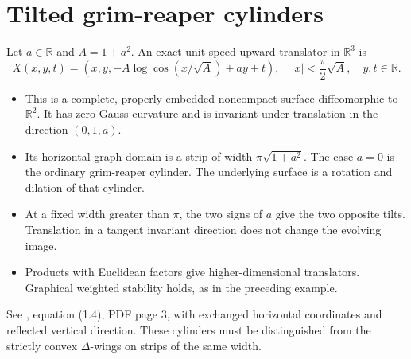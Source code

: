 \chapter{Tilted grim-reaper cylinders}\label{sec:catalogue-tilted-grim-reaper}
\begin{example}\label{ex:catalogue-tilted-grim-reaper}
Let $a\in\mathbb R$ and $A=1+a^2$. An exact unit-speed upward translator in $\mathbb R^3$ is
\[
 X(x,y,t)=\left(x,y,-A\log\cos(x/\sqrt A)+ay+t\right),\quad
 |x|<\frac\pi2\sqrt A,\quad y,t\in\mathbb R.
\]
\begin{itemize}
\item This is a complete, properly embedded noncompact surface diffeomorphic to $\mathbb R^2$. It has zero Gauss curvature and is invariant under translation in the direction $(0,1,a)$.
\item Its horizontal graph domain is a strip of width $\pi\sqrt{1+a^2}$. The case $a=0$ is the ordinary grim-reaper cylinder. The underlying surface is a rotation and dilation of that cylinder.
\item At a fixed width greater than $\pi$, the two signs of $a$ give the two opposite tilts. Translation in a tangent invariant direction does not change the evolving image.
\item Products with Euclidean factors give higher-dimensional translators. Graphical weighted stability holds, as in the preceding example.
\end{itemize}
See \cite{CatHIMWGraphical18}, equation (1.4), PDF page 3, with exchanged horizontal coordinates and reflected vertical direction. These cylinders must be distinguished from the strictly convex $\Delta$-wings on strips of the same width.
\end{example}


